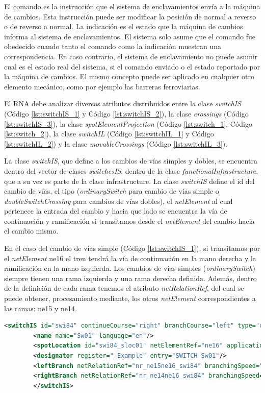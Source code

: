     El comando es la instrucción que el sistema de enclavamientos envía a la máquina de cambios. Esta instrucción puede ser modificar la posición de normal a reverso o de reverso a normal. La indicación es el estado que la máquina de cambios informa al sistema de enclavamientos. El sistema solo asume que el comando fue obedecido cuando tanto el comando como la indicación muestran una correspondencia. En caso contrario, el sistema de enclavamiento no puede asumir cual es el estado real del sistema, si el comando enviado o el estado reportado por la máquina de cambios. El mismo concepto puede ser aplicado en cualquier otro elemento mecánico, como por ejemplo las barreras ferroviarias.

    El RNA debe analizar diversos atributos distribuidos entre la clase \textit{switchIS} (Código \ref{lst:switchIS_1} y Código \ref{lst:switchIS_2}), la clase \textit{crossings} (Código \ref{lst:switchIS_3}), la clase \textit{spotElementProjection} (Código \ref{lst:switch_1}, Código \ref{lst:switch_2}), la clase \textit{switchIL} (Código \ref{lst:switchIL_1} y Código \ref{lst:switchIL_2}) y la clase \textit{movableCrossings} (Código \ref{lst:switchIL_3}). 
    
    La clase \textit{switchIS}, que define a los cambios de vías simples y dobles, se encuentra dentro del vector de clases \textit{switchesIS}, dentro de la clase \textit{functionalInfrastructure}, que a su vez es parte de la clase infrastructure. La clase \textit{switchIS} define el id del cambio de vías, el tipo (\textit{ordinarySwitch} para cambio de vías simple o \textit{doubleSwitchCrossing} para cambios de vías dobles), el \textit{netElement} al cual pertenece la entrada del cambio y hacia que lado se encuentra la vía de continuación y ramificación si transitamos desde el \textit{netElement} del cambio hacia el cambio mismo. 
    
    En el caso del cambio de vías simple (Código \ref{lst:switchIS_1}), si transitamos por el \textit{netElement} ne16 el tren tendrá la vía de continuación en la mano derecha y la ramificación en la mano izquierda. Los cambios de vías simples (\textit{ordinarySwitch}) siempre tienen una rama izquierda y una rama derecha definida. Además, dentro de la definición de cada rama tenemos el atributo \textit{netRelationRef}, del cual se puede obtener, procesamiento mediante, los otros \textit{netElement} correspondientes a las ramas: ne15 y ne14. 
    
    \begin{lstlisting}[language = XML, caption = Clase \textit{switchIS} (ordinarySwitch) , label = {lst:switchIS_1}]
    	<switchIS id="swi84" continueCourse="right" branchCourse="left" type="ordinarySwitch">
    	<name name="Sw01" language="en"/>
    	<spotLocation id="swi84_sloc01" netElementRef="ne16" applicationDirection="reverse" intrinsicCoord="0.0000"/>
    	<designator register="_Example" entry="SWITCH Sw01"/>
    	<leftBranch netRelationRef="nr_ne15ne16_swi84" branchingSpeed="0" joiningSpeed="0" radius="-500"/>
    	<rightBranch netRelationRef="nr_ne14ne16_swi84" branchingSpeed="0" joiningSpeed="0" radius="0"/>
    	</switchIS>
    \end{lstlisting}
    
